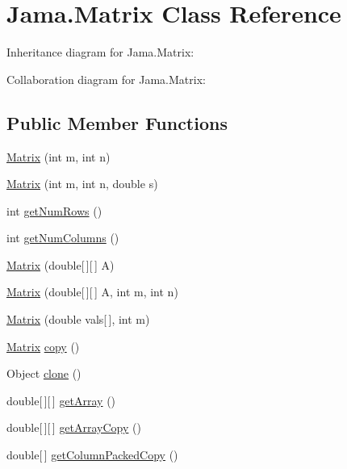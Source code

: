 \hypertarget{class_jama_1_1_matrix}{\section{Jama.\+Matrix Class Reference}
\label{class_jama_1_1_matrix}
}


Inheritance diagram for Jama.\+Matrix\+:


Collaboration diagram for Jama.\+Matrix\+:
\subsection*{Public Member Functions}
\begin{DoxyCompactItemize}
\item 
\hyperlink{class_jama_1_1_matrix_a877dfa361af400fbf817b1046856e239}{Matrix} (int m, int n)
\item 
\hyperlink{class_jama_1_1_matrix_a979949a74163b836dda8f2dd45323613}{Matrix} (int m, int n, double s)
\item 
int \hyperlink{class_jama_1_1_matrix_a4dd1acb3763939c5efb6c10c3121818b}{get\+Num\+Rows} ()
\item 
int \hyperlink{class_jama_1_1_matrix_a37f5c3aa789c5f938013453ee1890c5b}{get\+Num\+Columns} ()
\item 
\hyperlink{class_jama_1_1_matrix_a6de2ea8e266ff674bb47d08cbc8ebdc4}{Matrix} (double\mbox{[}$\,$\mbox{]}\mbox{[}$\,$\mbox{]} A)
\item 
\hyperlink{class_jama_1_1_matrix_a8ec8988b6c3f1a33e79bd52b64b4c678}{Matrix} (double\mbox{[}$\,$\mbox{]}\mbox{[}$\,$\mbox{]} A, int m, int n)
\item 
\hyperlink{class_jama_1_1_matrix_a5cbbcd32401e7ce76297bfd2ad044b61}{Matrix} (double vals\mbox{[}$\,$\mbox{]}, int m)
\item 
\hyperlink{class_jama_1_1_matrix}{Matrix} \hyperlink{class_jama_1_1_matrix_a571128c206168d38c707a43b41bb9661}{copy} ()
\item 
Object \hyperlink{class_jama_1_1_matrix_a07d5a928a5a152a6f508cae88ac07c7d}{clone} ()
\item 
double\mbox{[}$\,$\mbox{]}\mbox{[}$\,$\mbox{]} \hyperlink{class_jama_1_1_matrix_a5129a7c385e943684b43d4bc2daa2b65}{get\+Array} ()
\item 
double\mbox{[}$\,$\mbox{]}\mbox{[}$\,$\mbox{]} \hyperlink{class_jama_1_1_matrix_a518944310c17f3315c0a226ab711e1bf}{get\+Array\+Copy} ()
\item 
double\mbox{[}$\,$\mbox{]} \hyperlink{class_jama_1_1_matrix_a62efb942093464fcf4d8c2bd557d51fa}{get\+Column\+Packed\+Copy} ()

\end{DoxyCompactItemize}
